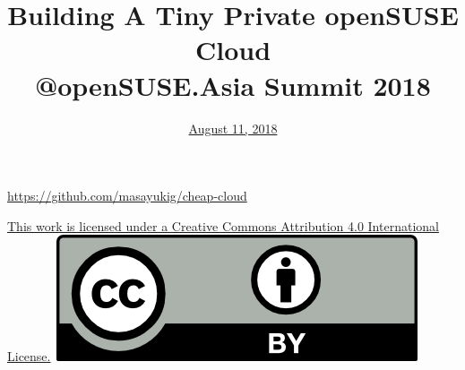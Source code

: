 \documentclass[aspectratio=169,11pt,hyperref={colorlinks=true}]{beamer}
\author[Masayuki Igawa]{%
    \texorpdfstring{%
        \begin{columns}
        \column{.45\linewidth}
            \centering
            Masayuki Igawa\\
            \href{mailto:masayuki@igawa.io}{masayuki@igawa.io}\\
            \texttt{masayukig on
              \href{https://freenode.net/}{Freenode},
              \href{https://github.com/masayukig}{GitHub},
              \href{https://twitter.com/masayukig}{Twitter},
              \href{https://www.linkedin.com/in/masayukig/}{LinkedIn}}
        \end{columns}
        }
    {Masayuki Igawa}
}
\date{\href{https://events.opensuse.org/conference/summitasia18/program/proposal/2101}{August 11, 2018}}
\title[private-cloud-on-openSUSE
  \hspace{2em}\insertframenumber/\inserttotalframenumber]{Building A
  Tiny Private openSUSE Cloud
  \\ @openSUSE.Asia Summit 2018}
\begin{document}
{%
\begin{frame}[noframenumbering]
  \hypersetup{colorlinks,urlcolor=susedark}
  \titlepage{}
  \centering
  \@place \par
  \href{https://github.com/masayukig/cheap-cloud}{https://github.com/masayukig/cheap-cloud}
  \vspace{1em}
  \begin{flushright}
    \tiny\href{https://creativecommons.org/licenses/by/4.0/}{This work
      is licensed under a Creative Commons Attribution 4.0
      International License.}~\includegraphics[scale=0.3]{cc_by.png}
  \end{flushright}
\end{frame}
}
\end{document}
